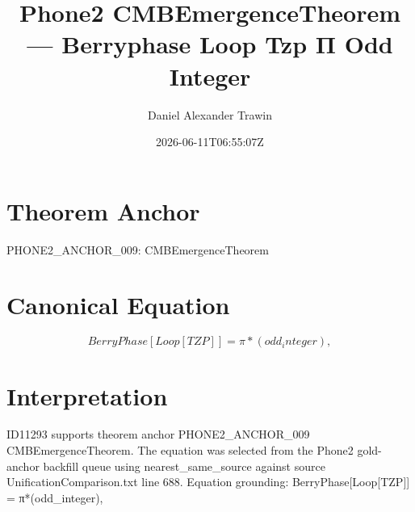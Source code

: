\documentclass[11pt]{article}
\title{Phone2 CMBEmergenceTheorem — Berryphase Loop Tzp Π Odd Integer}
\author{Daniel Alexander Trawin}
\date{2026-06-11T06:55:07Z}
\begin{document}
\maketitle
\section*{Theorem Anchor}
PHONE2_ANCHOR_009: CMBEmergenceTheorem
\section*{Canonical Equation}
\[
BerryPhase[Loop[TZP]] = π*(odd_integer),
\]
\section*{Interpretation}
ID11293 supports theorem anchor PHONE2_ANCHOR_009 CMBEmergenceTheorem. The equation was selected from the Phone2 gold-anchor backfill queue using nearest_same_source against source UnificationComparison.txt line 688. Equation grounding: BerryPhase[Loop[TZP]] = π*(odd_integer),
\end{document}
